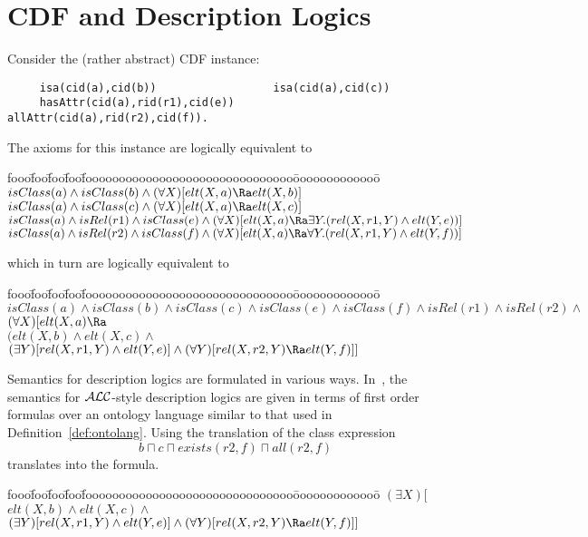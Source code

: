 \section{CDF and Description Logics}
\label{sec:comp} 

\begin{example} \rm \label{ex:classexpr}
Consider the (rather abstract) CDF instance: 
\begin{verbatim}
     isa(cid(a),cid(b))                  isa(cid(a),cid(c))
     hasAttr(cid(a),rid(r1),cid(e))      allAttr(cid(a),rid(r2),cid(f)).
\end{verbatim}
The axioms for this instance are logically equivalent to 
\begin{tabbing}
fooo\=foo\=foo\=foo\=fooooooooooooooooooooooooooooooo\=ooooooooooooo\=\kill
\> $isClass(a) \wedge isClass(b) \wedge 
	(\forall X)[elt(X,a) \Ra elt(X,b)] $ \\
\> $isClass(a) \wedge isClass(c) \wedge 
	(\forall X)[elt(X,a) \Ra elt(X,c)] $ \\	
\> $isClass(a) \wedge isRel(r1) \wedge isClass(e) \wedge 
     (\forall X)[elt(X,a) \Ra \exists Y.(rel(X,r1,Y) \wedge elt(Y,e))]$ \\
\> $isClass(a) \wedge isRel(r2) \wedge isClass(f) \wedge 
     (\forall X)[elt(X,a) \Ra \forall Y.(rel(X,r1,Y) \wedge elt(Y,f))]$ 
\end{tabbing}
which in turn are logically equivalent to
\begin{tabbing}
fooo\=foo\=foo\=foo\=fooooooooooooooooooooooooooooooo\=ooooooooooooo\=\kill
$isClass(a) \wedge isClass(b) \wedge isClass(c) \wedge isClass(e) 
	\wedge isClass(f) \wedge isRel(r1) \wedge isRel(r2)  \wedge $ \\
$(\forall X)[elt(X,a) \Ra$ \\
\> \> $(elt(X,b) \wedge  elt(X,c) \wedge$ \\
\> \> $(\exists Y)[rel(X,r1,Y) \wedge elt(Y,e)] \wedge
      (\forall Y)[rel(X,r2,Y) \Ra elt(Y,f)]]$ 
\end{tabbing}
Semantics for description logics are formulated in various ways.
In~\cite{Swif03}, the semantics for ${\cal ALC}$-style description
logics are given in terms of first order formulas over an ontology
language similar to that used in Definition~\ref{def:ontolang}.  Using
the translation of \cite{Swif03} the class expression
\[ b \sqcap c \sqcap exists(r2,f) \sqcap all(r2,f) \]
translates into the formula.
\begin{tabbing}
fooo\=foo\=foo\=foo\=fooooooooooooooooooooooooooooooo\=ooooooooooooo\=\kill
\>  $(\exists X)[ $ 
$ elt(X,b) \wedge elt(X,c)  \wedge $ \\
\> \> $(\exists Y)[rel(X,r1,Y) \wedge elt (Y,e)] \wedge 
       (\forall Y)[rel(X,r2,Y) \Ra elt(Y,f)]]$
\end{tabbing}
\end{example}

